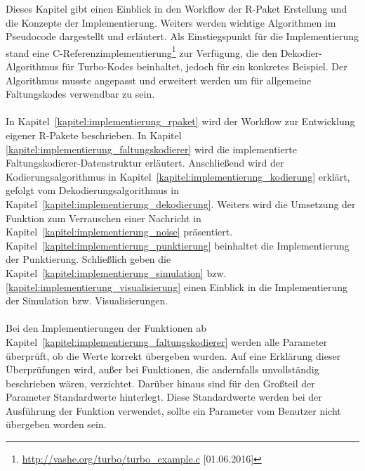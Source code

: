 Dieses Kapitel gibt einen Einblick in den Workflow der R-Paket Erstellung und die Konzepte der Implementierung. Weiters werden wichtige Algorithmen im Pseudocode dargestellt und erläutert. Als Einstiegspunkt für die Implementierung stand eine C-Referenzimplementierung\footnote{\url{http://vashe.org/turbo/turbo_example.c} [01.06.2016]} zur Verfügung, die den Dekodier-Algorithmus für Turbo-Kodes beinhaltet, jedoch für ein konkretes Beispiel. Der Algorithmus musste angepasst und erweitert werden um für allgemeine Faltungskodes verwendbar zu sein.
\\
\\
In Kapitel~\ref{kapitel:implementierung_rpaket} wird der Workflow zur Entwicklung eigener R-Pakete beschrieben. In Kapitel \ref{kapitel:implementierung_faltungskodierer} wird die implementierte Faltungskodierer-Datenstruktur erläutert. Anschließend wird der Kodierungsalgorithmus in Kapitel~\ref{kapitel:implementierung_kodierung} erklärt, gefolgt vom Dekodierungsalgorithmus in Kapitel~\ref{kapitel:implementierung_dekodierung}. Weiters wird die Umsetzung der Funktion zum Verrauschen einer Nachricht in Kapitel~\ref{kapitel:implementierung_noise} präsentiert. Kapitel~\ref{kapitel:implementierung_punktierung} beinhaltet die Implementierung der Punktierung. Schließlich geben die Kapitel~\ref{kapitel:implementierung_simulation} bzw. \ref{kapitel:implementierung_visualisierung} einen Einblick in die Implementierung der Simulation bzw. Visualisierungen.
\\
\\
Bei den Implementierungen der Funktionen ab Kapitel~\ref{kapitel:implementierung_faltungskodierer} werden alle Parameter überprüft, ob die Werte korrekt übergeben wurden. Auf eine Erklärung dieser Überprüfungen wird, außer bei Funktionen, die andernfalls unvollständig beschrieben wären, verzichtet. Darüber hinaus sind für den Großteil der Parameter Standardwerte hinterlegt. Diese Standardwerte werden bei der Ausführung der Funktion verwendet, sollte ein Parameter vom Benutzer nicht übergeben worden sein.
